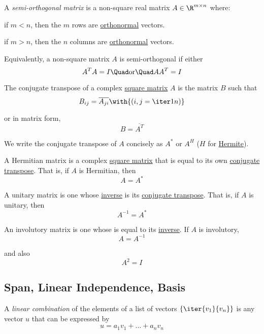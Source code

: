 \label{e4afc53}

A \textit{semi-orthogonal matrix} is a non-square real matrix $A\in\R^{m\times
n}$ where:
\begin{enumerati}
  \item if $m<n$, then the $m$ rows are \href{d90fcb1}{orthonormal} vectors.
  \item if $m>n$, then the $n$ columns are \href{d90fcb1}{orthonormal} vectors.
\end{enumerati}

Equivalently, a non-square matrix $A$ is semi-orthogonal if either
$$
  A^TA=I\Quad\text{or}\Quad AA^T=I
$$

\label{abdc1e4}

The conjugate transpose of a complex \href{d917f93}{square matrix} $A$ is the
matrix $B$ such that
$$
  B_{ij}=\overline{A_{ji}}\with{(i,j=\iter1n)}
$$

or in matrix form,
$$
  B=\overline{A^T}
$$

We write the conjugate transpose of $A$ concisely as $A^*$ or $A^H$ ($H$ for
\href{a633178}{Hermite}).

\label{a633178}

A Hermitian matrix is a complex \href{d917f93}{square matrix} that is equal to
its own \href{abdc1e4}{conjugate transpose}. That is, if $A$ is Hermitian, then
$$
  A=A^*
$$

\label{a32560c}

A unitary matrix is one whose \href{ce4daa8}{inverse} is its
\href{abdc1e4}{conjugate transpose}. That is, if $A$ is unitary, then
$$
  A^{-1}=A^*
$$

\label{bb02509}

An involutory matrix is one whose is equal to its \href{ce4daa8}{inverse}. If
$A$ is involutory,
$$
  A=A^{-1}
$$

and also
$$
  A^2=I
$$

\nextsection
\subsection{Span, Linear Independence, Basis}\label{c0226c8}

\label{ceb6342}

A \textit{linear combination} of the elements of a list of vectors
$\{\iter{v_1}{v_n}\}$ is any vector $u$ that can be expressed by
$$
  u=a_1v_1+\ldots+a_nv_n
$$

